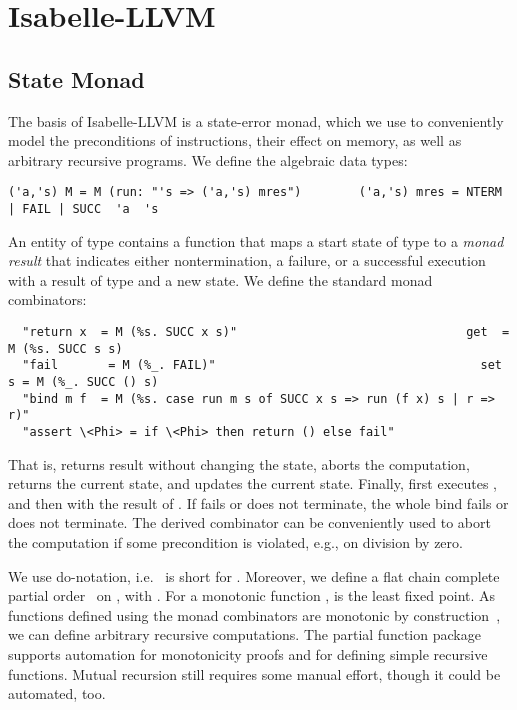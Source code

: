 \documentclass[a4paper,USenglish,cleveref, autoref]{lipics-v2019}
\begin{document}
\section{Isabelle-LLVM}\label{sec:semantics}
\subsection{State Monad}
The basis of Isabelle-LLVM is a state-error monad, which we use to conveniently model the preconditions of instructions, their effect 
on memory, as well as arbitrary recursive programs. We define the algebraic data types:
\begin{lstlisting}
('a,'s) M = M (run: "'s => ('a,'s) mres")        ('a,'s) mres = NTERM | FAIL | SUCC  'a  's
\end{lstlisting}
An entity of type  contains a function  that maps a start state of type  to 
a \emph{monad result} that indicates either nontermination, a failure, or a successful execution with a result of type  and a new state.
We define the standard monad combinators:
\begin{lstlisting}
  "return x  = M (%s. SUCC x s)"                                get  = M (%s. SUCC s s)
  "fail       = M (%_. FAIL)"                                     set s = M (%_. SUCC () s)
  "bind m f  = M (%s. case run m s of SUCC x s => run (f x) s | r => r)"
  "assert \<Phi> = if \<Phi> then return () else fail"
\end{lstlisting}
That is,  returns result  without changing the state,  aborts the computation,
 returns the current state, and  updates the current state.
Finally,  first executes , and then  with the result of .
If  fails or does not terminate, the whole bind fails or does not terminate.  
The derived  combinator can be conveniently used to abort the computation 
if some precondition is violated, e.g., on division by zero.

We use do-notation, i.e.\  is short for .
Moreover, we define a flat chain complete partial order~\cite{Mark76} on , with .
For a monotonic function ,  is the least fixed point.
As functions defined using the monad combinators are monotonic by construction~\cite{Kr10}, 
we can define arbitrary recursive computations. The partial function package~\cite{Kr10} supports automation for monotonicity 
proofs and for defining simple recursive functions. Mutual recursion still requires some manual effort, though it could be automated, too.
\end{document}
